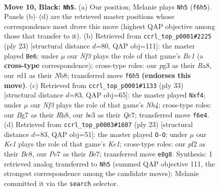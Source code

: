 \documentclass[11pt]{article}
\begin{document}
\clearpage

\begin{figure}[p]\centering
\begin{subfigure}{0.46\textwidth}\centering
\resizebox{\linewidth}{!}{%
\newchessgame
\chessboard[
  setfen={rnb1k2r/ppq1p1bp/3p1np1/4p3/4P3/2N1BQP1/PPP2P1P/2KR1B1R b kq - 0 10},
  showmover=false,
  pgfstyle=straightmove, color=movearrow, markmove={f6-h5}
]}
\caption{}
\end{subfigure}\hfill
\begin{subfigure}{0.46\textwidth}\centering
\resizebox{\linewidth}{!}{%
\newchessgame
\chessboard[
  setfen={rnb1k2r/2q1bpp1/p2p1n1p/1p2p3/4P1P1/PNN1BQ1P/1PP2P2/R3KB1R b KQkq - 0 12},
  showmover=false,
  pgfstyle=straightmove, color=movearrow, markmove={c8-e6}
]}
\caption{}
\end{subfigure}
\\[4pt]
\begin{subfigure}{0.46\textwidth}\centering
\resizebox{\linewidth}{!}{%
\newchessgame
\chessboard[
  setfen={r3k2r/2qn1pb1/pp1p2p1/3Pp1Bn/5P1p/1NP5/PP1QB1PP/R4R1K b kq - 0 17},
  showmover=false,
  pgfstyle=straightmove, color=movearrow, markmove={h5-f4}
]}
\caption{}
\end{subfigure}\hfill
\begin{subfigure}{0.46\textwidth}\centering
\resizebox{\linewidth}{!}{%
\newchessgame
\chessboard[
  setfen={r1b1k2r/4bppp/pq1ppn2/2p5/4PB2/1BN2P2/PPP1Q1PP/2KR3R b kq - 1 12},
  showmover=false,
  pgfstyle=straightmove, color=movearrow, markmove={e8-g8}
]}
\caption{}
\end{subfigure}
\caption{\textbf{Move 10, Black: \texttt{Nh5}.} (a) Our position; Melanie plays \texttt{Nh5} (\texttt{f6h5}). Panels (b)--(d) are the retrieved master positions whose correspondence most drove this move (highest QAP objective among those that transfer to it). (b) Retrieved from \texttt{ccrl\_top\_p0001\#2225} (ply 23) [structural distance $d$=80, QAP obj=111]: the master played \texttt{Be6}; under $\mu$ our \emph{Nf3} plays the role of that game's \emph{Bc1} (a \textbf{cross-type} correspondence); cross-type roles: our \emph{p}g3 as their \emph{R}a8, our \emph{r}d1 as their \emph{N}b8; transferred move \texttt{f6h5} \textbf{(endorses this move)}. (c) Retrieved from \texttt{ccrl\_top\_p0001\#1133} (ply 33) [structural distance $d$=83, QAP obj=65]: the master played \texttt{Nxf4}; under $\mu$ our \emph{Nf3} plays the role of that game's \emph{Nh4}; cross-type roles: our \emph{B}g7 as their \emph{R}h8, our \emph{b}e3 as their \emph{Q}c7; transferred move \texttt{f6e4}. (d) Retrieved from \texttt{ccrl\_top\_p0003\#1607} (ply 23) [structural distance $d$=83, QAP obj=51]: the master played \texttt{O-O}; under $\mu$ our \emph{Ke1} plays the role of that game's \emph{Ke1}; cross-type roles: our \emph{p}f2 as their \emph{B}c8, our \emph{P}e7 as their \emph{B}e7; transferred move \texttt{e8g8}. Synthesis: 1 retrieved analog transferred to \texttt{Nh5} (summed QAP objective 111, the strongest correspondence among the candidate moves); Melanie committed it via the \texttt{search} selector.}
\label{fig:thought-m19}
\end{figure}
\end{document}
